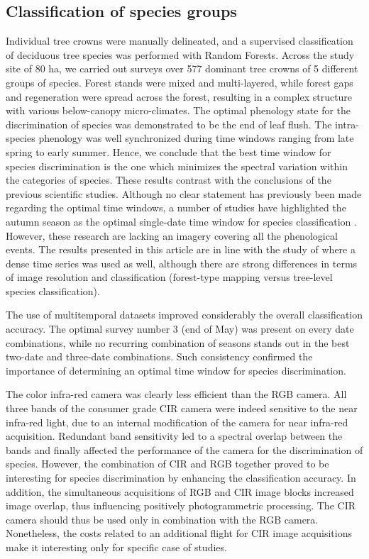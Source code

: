 \documentclass[remotesensing,article,submit,moreauthors,pdftex,12pt,a4paper]{mdpi} %
\begin{document}
\subsection{Classification of species groups}

Individual tree crowns were manually delineated, and a supervised classification of deciduous tree species was performed with Random Forests. 
Across the study site of 80 ha, we carried out surveys over 577 dominant tree crowns of 5 different groups of species. 
Forest stands were mixed and multi-layered, while forest gaps and regeneration were spread across the forest, resulting in a complex structure with various below-canopy micro-climates. 
The optimal phenology state for the discrimination of species was demonstrated to be the end of leaf flush. 
The intra-species phenology was well synchronized during time windows ranging from late spring to early summer. 
Hence, we conclude that the best time window for species discrimination is the one which minimizes the spectral variation within the categories of species. 
These results contrast with the conclusions of the previous scientific studies. 
Although no clear statement has previously been made regarding the optimal time windows, a number of studies have highlighted the autumn season as the optimal single-date time window for species classification \citep{key_comparison_2001,hill_mapping_2010, somers_multitemporal_2013}. 
However, these research are lacking an imagery covering all the phenological events.
The results presented in this article are in line with the study of \citeauthor{kempeneers_data_2011} \cite{kempeneers_data_2011} where a dense time series was used as well, although there are strong differences in terms of image resolution and classification (forest-type mapping versus tree-level species classification).

The use of multitemporal datasets improved considerably the overall classification accuracy. 
The optimal survey number 3 (end of May) was present on every date combinations, while no recurring combination of seasons stands out in the best two-date and three-date combinations.
Such consistency confirmed the importance of determining an optimal time window for species discrimination.

The color infra-red camera was clearly less efficient than the RGB camera. All three bands of the consumer grade CIR camera were indeed sensitive to the near infra-red light, due to an internal modification of the camera for near infra-red acquisition. Redundant band sensitivity led to a spectral overlap between the bands and finally affected the performance of the camera for the discrimination of species. However, the combination of CIR and RGB together proved to be interesting for species discrimination by enhancing the classification accuracy.
In addition, the simultaneous acquisitions of RGB and CIR image blocks increased image overlap, thus influencing positively photogrammetric processing.
The CIR camera should thus be used only in combination with the RGB camera.
Nonetheless, the costs related to an additional flight for CIR image acquisitions make it interesting only for specific case of studies.
\end{document}
